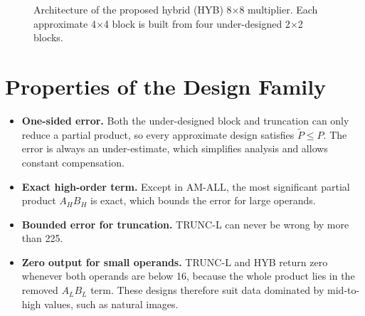 \documentclass[12pt,a4paper,oneside]{report}
\begin{document}
\begin{figure}[ht]
\centering
{}
\caption{Architecture of the proposed hybrid (HYB) 8$\times$8 multiplier. Each approximate 4$\times$4 block is built from four under-designed 2$\times$2 blocks.}
\label{fig:arch}
\end{figure}

\section{Properties of the Design Family}
\begin{itemize}
\item \textbf{One-sided error.} Both the under-designed block and truncation can only reduce a partial product, so every approximate design satisfies $\tilde{P}\le P$. The error is always an under-estimate, which simplifies analysis and allows constant compensation.
\item \textbf{Exact high-order term.} Except in AM-ALL, the most significant partial product $A_HB_H$ is exact, which bounds the error for large operands.
\item \textbf{Bounded error for truncation.} TRUNC-L can never be wrong by more than 225.
\item \textbf{Zero output for small operands.} TRUNC-L and HYB return zero whenever both operands are below 16, because the whole product lies in the removed $A_LB_L$ term. These designs therefore suit data dominated by mid-to-high values, such as natural images.
\end{itemize}
\end{document}
